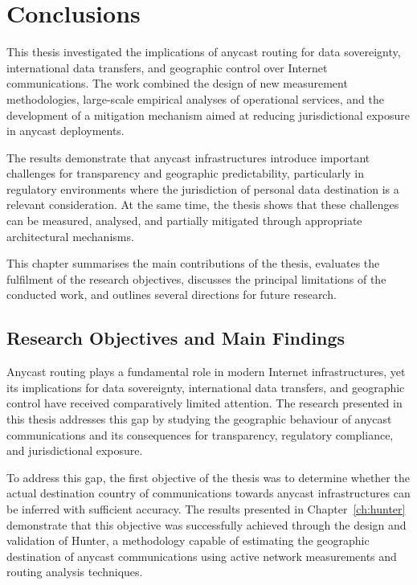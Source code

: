 \chapter{Conclusions}
\label{ch:conclusion}

This thesis investigated the implications of anycast routing for data sovereignty, international data transfers, and geographic control over Internet communications. The work combined the design of new measurement methodologies, large-scale empirical analyses of operational services, and the development of a mitigation mechanism aimed at reducing jurisdictional exposure in anycast deployments.

The results demonstrate that anycast infrastructures introduce important challenges for transparency and geographic predictability, particularly in regulatory environments where the jurisdiction of personal data destination is a relevant consideration. At the same time, the thesis shows that these challenges can be measured, analysed, and partially mitigated through appropriate architectural mechanisms.

This chapter summarises the main contributions of the thesis, evaluates the fulfilment of the research objectives, discusses the principal limitations of the conducted work, and outlines several directions for future research.

\section{Research Objectives and Main Findings}
\label{sc:conclusion_objectives}

Anycast routing plays a fundamental role in modern Internet infrastructures, yet its implications for data sovereignty, international data transfers, and geographic control have received comparatively limited attention. The research presented in this thesis addresses this gap by studying the geographic behaviour of anycast communications and its consequences for transparency, regulatory compliance, and jurisdictional exposure.

To address this gap, the first objective of the thesis was to determine whether the actual destination country of communications towards anycast infrastructures can be inferred with sufficient accuracy. The results presented in Chapter~\ref{ch:hunter} demonstrate that this objective was successfully achieved through the design and validation of Hunter, a methodology capable of estimating the geographic destination of anycast communications using active network measurements and routing analysis techniques.

